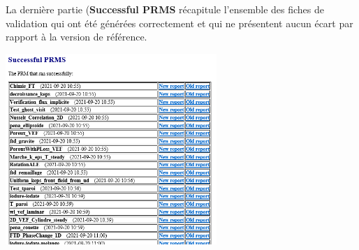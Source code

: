\begin{minipage}[c]{0.5\linewidth}
La dernière partie (\textbf{Successful PRMS} récapitule l'ensemble des fiches de validation qui ont été générées correctement et qui ne présentent aucun écart par rapport à la version de référence.
\end{minipage} \hfill
\begin{minipage}[c]{0.45\linewidth}
   \includegraphics[width=8cm]{pictures/validation-success.png}\vspace*{0.2cm}
\vspace{0.6cm}   
\end{minipage}

